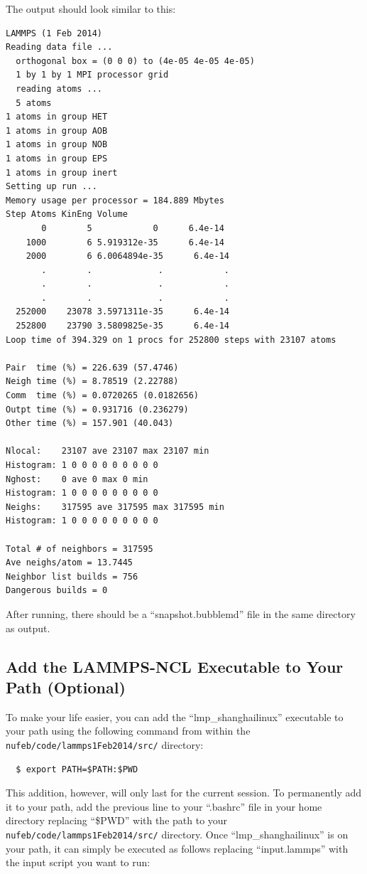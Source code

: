 \documentclass[11pt,a4paper,openright]{article}
\begin{document}
\noindent
The output should look similar to this:

\begin{verbatim}
LAMMPS (1 Feb 2014)
Reading data file ...
  orthogonal box = (0 0 0) to (4e-05 4e-05 4e-05)
  1 by 1 by 1 MPI processor grid
  reading atoms ...
  5 atoms
1 atoms in group HET
1 atoms in group AOB
1 atoms in group NOB
1 atoms in group EPS
1 atoms in group inert
Setting up run ...
Memory usage per processor = 184.889 Mbytes
Step Atoms KinEng Volume 
       0        5            0      6.4e-14 
    1000        6 5.919312e-35      6.4e-14 
    2000        6 6.0064894e-35      6.4e-14 
       .        .             .            .
       .        .             .            .
       .        .             .            .
  252000    23078 3.5971311e-35      6.4e-14 
  252800    23790 3.5809825e-35      6.4e-14 
Loop time of 394.329 on 1 procs for 252800 steps with 23107 atoms

Pair  time (%) = 226.639 (57.4746)
Neigh time (%) = 8.78519 (2.22788)
Comm  time (%) = 0.0720265 (0.0182656)
Outpt time (%) = 0.931716 (0.236279)
Other time (%) = 157.901 (40.043)

Nlocal:    23107 ave 23107 max 23107 min
Histogram: 1 0 0 0 0 0 0 0 0 0
Nghost:    0 ave 0 max 0 min
Histogram: 1 0 0 0 0 0 0 0 0 0
Neighs:    317595 ave 317595 max 317595 min
Histogram: 1 0 0 0 0 0 0 0 0 0

Total # of neighbors = 317595
Ave neighs/atom = 13.7445
Neighbor list builds = 756
Dangerous builds = 0
\end{verbatim}

\noindent
After running, there should be a ``snapshot.bubblemd'' file in the same directory as output.

\subsection{Add the LAMMPS-NCL Executable to Your Path (Optional)}

\noindent
To make your life easier, you can add the ``lmp\_shanghailinux'' executable to your path using the following command from within the \\ {\tt nufeb/code/lammps1Feb2014/src/} directory:

\begin{verbatim}
  $ export PATH=$PATH:$PWD
\end{verbatim}

\noindent
This addition, however, will only last for the current session.  To permanently add it to your path, add the previous line to your ``.bashrc'' file in your home directory replacing ``\$PWD'' with the path to your \\ {\tt nufeb/code/lammps1Feb2014/src/} directory.  Once ``lmp\_shanghailinux'' is on your path, it can simply be executed as follows replacing ``input.lammps'' with the input script you want to run:
\end{document}
